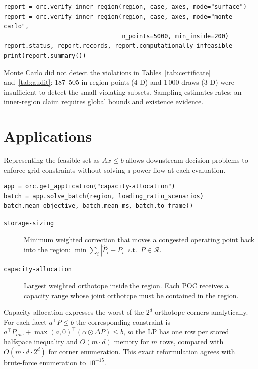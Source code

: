 \documentclass[11pt,a4paper]{report}
\newcommand{\why}[1]{\par\medskip\begingroup\noindent #1\par\endgroup\medskip}
\newcommand{\trap}[1]{\begin{warnbox}#1\end{warnbox}}
\newcommand{\code}[1]{\texttt{\small #1}}
\begin{document}
\begin{lstlisting}
report = orc.verify_inner_region(region, case, axes, mode="surface")
report = orc.verify_inner_region(region, case, axes, mode="monte-carlo",
                                 n_points=5000, min_inside=200)
report.status, report.records, report.computationally_infeasible
print(report.summary())
\end{lstlisting}

\trap{Monte Carlo did not detect the violations in Tables~\ref{tab:certificate}
and~\ref{tab:audit}: 187--505 in-region points (4-D) and 1\,000 draws (3-D)
were insufficient to detect the small violating subsets. Sampling estimates
rates; an inner-region claim requires global bounds and existence evidence.}

\chapter{Applications}
\label{ch:applications}

Representing the feasible set as $Ax \le b$ allows downstream decision problems
to enforce grid constraints without solving a power flow at each evaluation.

\begin{lstlisting}
app = orc.get_application("capacity-allocation")
batch = app.solve_batch(region, loading_ratio_scenarios)
batch.mean_objective, batch.mean_ms, batch.to_frame()
\end{lstlisting}

\begin{description}
\item[\code{storage-sizing}] Minimum weighted correction that moves a congested
  operating point back into the region:
  $\min \sum_i |\hat P_i - P_i|$ s.t.\ $P \in \mathcal{R}$.
\item[\code{capacity-allocation}] Largest weighted orthotope inside the region.
  Each POC receives a capacity range whose joint orthotope must be contained
  in the region.
\end{description}

\why{Capacity allocation expresses the worst of the $2^d$ orthotope corners analytically.
For each facet $a^\top P \le b$ the corresponding constraint is
$a^\top P_{low} + \max(a, 0)^\top(\alpha \odot \Delta P) \le b$, so the LP has
one row per stored halfspace inequality and $O(m \cdot d)$ memory for $m$
rows, compared with $O(m \cdot d \cdot 2^d)$ for corner enumeration. This exact
reformulation agrees with brute-force enumeration to $10^{-15}$.}
\end{document}
